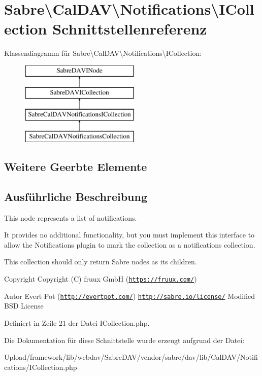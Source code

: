 \hypertarget{interface_sabre_1_1_cal_d_a_v_1_1_notifications_1_1_i_collection}{}\section{Sabre\textbackslash{}Cal\+D\+AV\textbackslash{}Notifications\textbackslash{}I\+Collection Schnittstellenreferenz}
\label{interface_sabre_1_1_cal_d_a_v_1_1_notifications_1_1_i_collection}
Klassendiagramm für Sabre\textbackslash{}Cal\+D\+AV\textbackslash{}Notifications\textbackslash{}I\+Collection\+:\begin{figure}[H]
\begin{center}
\leavevmode
\includegraphics[height=4.000000cm]{interface_sabre_1_1_cal_d_a_v_1_1_notifications_1_1_i_collection}
\end{center}
\end{figure}
\subsection*{Weitere Geerbte Elemente}


\subsection{Ausführliche Beschreibung}
This node represents a list of notifications.

It provides no additional functionality, but you must implement this interface to allow the Notifications plugin to mark the collection as a notifications collection.

This collection should only return Sabre nodes as its children.

\begin{DoxyCopyright}{Copyright}
Copyright (C) fruux GmbH (\href{https://fruux.com/}{\tt https\+://fruux.\+com/}) 
\end{DoxyCopyright}
\begin{DoxyAuthor}{Autor}
Evert Pot (\href{http://evertpot.com/}{\tt http\+://evertpot.\+com/})  \href{http://sabre.io/license/}{\tt http\+://sabre.\+io/license/} Modified B\+SD License 
\end{DoxyAuthor}


Definiert in Zeile 21 der Datei I\+Collection.\+php.



Die Dokumentation für diese Schnittstelle wurde erzeugt aufgrund der Datei\+:\begin{DoxyCompactItemize}
\item 
Upload/framework/lib/webdav/\+Sabre\+D\+A\+V/vendor/sabre/dav/lib/\+Cal\+D\+A\+V/\+Notifications/I\+Collection.\+php\end{DoxyCompactItemize}
